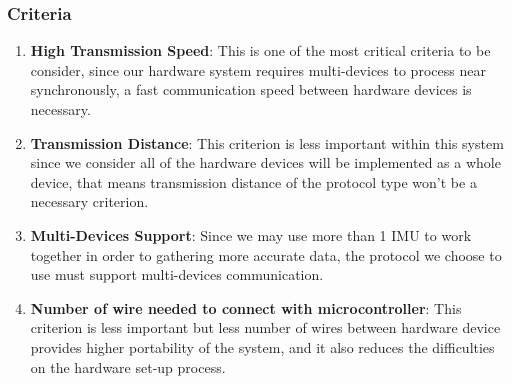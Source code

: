\subsubsection{Criteria}
\begin{enumerate}
	\item \textbf{High Transmission Speed}: This is one of the most critical criteria to be consider, since our hardware system requires multi-devices to process near synchronously, a fast communication speed between hardware devices is necessary.
	\item \textbf{Transmission Distance}: This criterion is less important within this system since we consider all of the hardware devices will be implemented as a whole device, that means transmission distance of the protocol type won’t be a necessary criterion.
	\item \textbf{Multi-Devices Support}: Since we may use more than 1 IMU to work together in order to gathering more accurate data, the protocol we choose to use must support multi-devices communication.
	\item \textbf{Number of wire needed to connect with microcontroller}: This criterion is less important but less number of wires between hardware device provides higher portability of the system, and it also reduces the difficulties on the hardware set-up process.\\
\end{enumerate}

